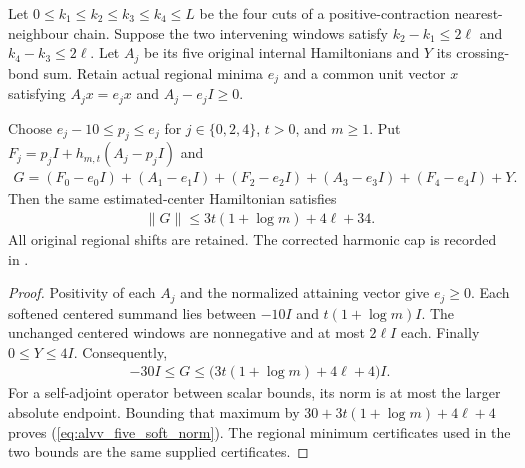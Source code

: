 \begin{lemma}
    \label{lem:alvv_five_soft_norm}
    \leanok
    Let $0\le k_1\le k_2\le k_3\le k_4\le L$ be the four cuts of
    a positive-contraction nearest-neighbour chain. Suppose the two
    intervening windows satisfy $k_2-k_1\le2\ell$ and
    $k_4-k_3\le2\ell$. Let $A_j$ be its five original internal
    Hamiltonians and $Y$ its crossing-bond sum. Retain actual regional
    minima $e_j$ and a common unit vector $x$ satisfying
    $A_jx=e_jx$ and $A_j-e_jI\ge0$.

    Choose $e_j-10\le p_j\le e_j$ for $j\in\{0,2,4\}$, $t>0$,
    and $m\ge1$. Put $F_j=p_jI+h_{m,t}(A_j-p_jI)$ and
    \begin{align}
        G=(F_0-e_0I)+(A_1-e_1I)+(F_2-e_2I)
        +(A_3-e_3I)+(F_4-e_4I)+Y.
    \end{align}
    Then the same estimated-center Hamiltonian satisfies
    \begin{align}
        \|G\|\le3t(1+\log m)+4\ell+34.
        \label{eq:alvv_five_soft_norm}
    \end{align}
    All original regional shifts are retained. The corrected harmonic
    cap is recorded in \cite{gap:alvv16_soft_truncation_log_bound}.
\end{lemma}
\begin{proof}\leanok
    Positivity of each $A_j$ and the normalized attaining vector give
    $e_j\ge0$. Each softened centered summand lies between $-10I$
    and $t(1+\log m)I$. The unchanged centered windows are nonnegative
    and at most $2\ell I$ each. Finally $0\le Y\le4I$. Consequently,
    \begin{align}
        -30I\le G\le\bigl(3t(1+\log m)+4\ell+4\bigr)I.
    \end{align}
    For a self-adjoint operator between scalar bounds, its norm is at
    most the larger absolute endpoint. Bounding that maximum by
    $30+3t(1+\log m)+4\ell+4$ proves
    (\ref{eq:alvv_five_soft_norm}). The regional minimum certificates
    used in the two bounds are the same supplied certificates.
\end{proof}

